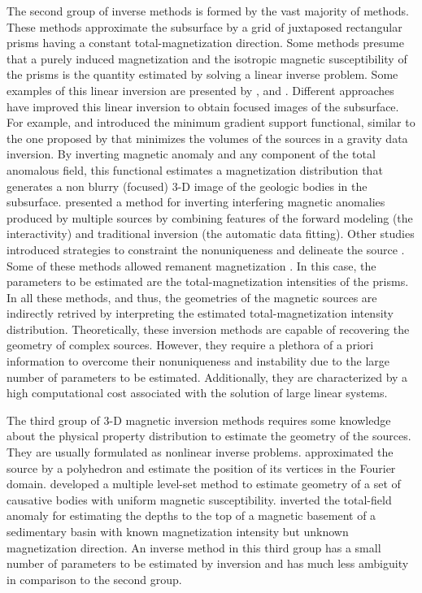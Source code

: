The second group of inverse methods is formed by the vast majority of methods. 
These methods approximate the subsurface by a grid of juxtaposed rectangular prisms having 
a constant total-magnetization direction. Some methods presume that a purely induced 
magnetization and the isotropic magnetic susceptibility of the prisms is the quantity estimated by solving a linear inverse problem. 
Some examples of this linear inversion are presented by \cite{cribb-1976}, \cite{li_3-d_1996} and \cite{pilkington_3-d_1997}.
Different approaches have improved this linear inversion to obtain focused images of the subsurface. 
For example, \cite{portniaguine_focusing_1999} and \cite{portniaguine_3d_2002} introduced the minimum gradient support functional, similar to the one proposed by
\cite{last-1983} that minimizes the volumes of the sources in a gravity data inversion. 
By inverting magnetic anomaly and any component of the total anomalous field, this functional estimates a magnetization distribution  that generates a non blurry (focused) 3-D image of  the geologic bodies in the subsurface.
\cite{barbosa_interactive_2006} presented a method for inverting interfering magnetic anomalies produced by multiple sources by combining  features of the forward modeling (the interactivity) and traditional inversion (the automatic data fitting). Other studies introduced strategies to constraint the nonuniqueness and delineate the source \cite[]{tontini,pilkington_3d_2009,shamsipour_3d_2011,cella_inversion_2012,abedi-2015}. 
Some of these methods allowed remanent magnetization \cite[e.g., ][]{pignatelli-2006}. 
In this case, the parameters to be estimated are the total-magnetization intensities 
of the prisms. 
In all these methods, and thus, the geometries of the magnetic sources are indirectly retrived by interpreting the estimated total-magnetization intensity 
distribution. 
Theoretically, these inversion methods are capable of recovering the geometry of complex 
sources. However, they require a plethora of a priori information to overcome 
their nonuniqueness and instability due to the large number of parameters 
to be estimated. Additionally, they are characterized by a high 
computational cost associated with the solution of large linear systems.

The third group of 3-D magnetic inversion methods requires some knowledge about the 
physical property distribution to estimate the geometry of the sources. 
They are usually formulated as nonlinear inverse problems. 
\cite{wang_inversion_1990} approximated the source by a polyhedron and estimate 
the position of its vertices in the Fourier domain. 
\cite{wenbin-2017} developed a multiple level-set method to estimate geometry 
of a set of causative bodies with uniform magnetic susceptibility. 
\cite{hidalgo-2019} inverted the total-field anomaly for estimating the depths to the top of a magnetic basement of a sedimentary basin with known magnetization intensity but unknown magnetization direction. 
An inverse method in this third group has a small number of parameters to be estimated by inversion and has much less ambiguity in comparison to the second group. 

